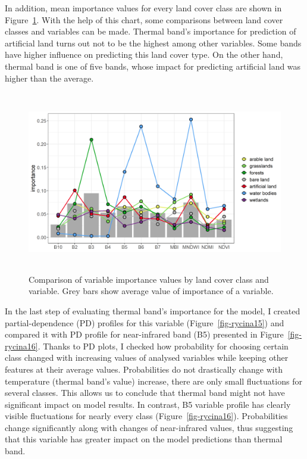 \documentclass{amuthesis}
\begin{document}
In addition, mean importance values for every land cover class are shown
in Figure~\ref{fig-rycina14a}. With the help of this chart, some
comparisons between land cover classes and variables can be made.
Thermal band's importance for prediction of artificial land turns out
not to be the highest among other variables. Some bands have higher
influence on predicting this land cover type. On the other hand, thermal
band is one of five bands, whose impact for predicting artificial land
was higher than the average.

\begin{figure}[H]

{\centering \includegraphics[width=5.59375in,height=3.125in]{./figures/importance_comparison.png}

}

\caption{\label{fig-rycina14a}Comparison of variable importance values
by land cover class and variable. Grey bars show average value of
importance of a variable.}

\end{figure}

In the last step of evaluating thermal band's importance for the model,
I created partial-dependence (PD) profiles for this variable
(Figure~\ref{fig-rycina15}) and compared it with PD profile for
near-infrared band (B5) presented in Figure~\ref{fig-rycina16}. Thanks
to PD plots, I checked how probability for choosing certain class
changed with increasing values of analysed variables while keeping other
features at their average values. Probabilities do not drastically
change with temperature (thermal band's value) increase, there are only
small fluctuations for several classes. This allows us to conclude that
thermal band might not have significant impact on model results. In
contrast, B5 variable profile has clearly visible fluctuations for
nearly every class (Figure~\ref{fig-rycina16}). Probabilities change
significantly along with changes of near-infrared values, thus
suggesting that this variable has greater impact on the model
predictions than thermal band.
\end{document}
